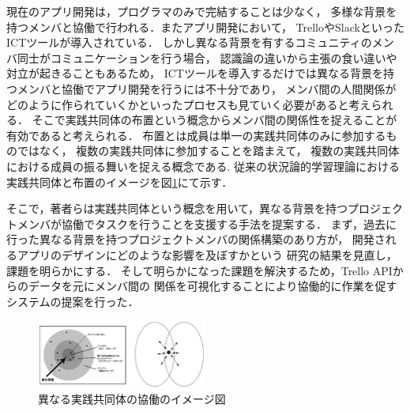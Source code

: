 
現在のアプリ開発は，プログラマのみで完結することは少なく，
多様な背景を持つメンバと協働で行われる．またアプリ開発において，
TrelloやSlackといったICTツールが導入されている．
しかし異なる背景を有するコミュニティのメンバ同士がコミュニケーションを行う場合，
認識論の違いから主張の食い違いや対立が起きることもあるため\cite{conflict}，
ICTツールを導入するだけでは異なる背景を持つメンバと協働でアプリ開発を行うには不十分であり，
メンバ間の人間関係がどのように作られていくかといったプロセスも見ていく必要があると考えられる．
そこで実践共同体\cite{Matsumoto}の布置という概念からメンバ間の関係性を捉えることが有効であると考えられる．
布置とは成員は単一の実践共同体のみに参加するものではなく，
複数の実践共同体に参加することを踏まえて，
複数の実践共同体における成員の振る舞いを捉える概念である.
従来の状況論的学習理論における実践共同体\cite{copImg}と布置のイメージを図\ref{cop-overlap}にて示す．

そこで，著者らは実践共同体という概念を用いて，異なる背景を持つプロジェクトメンバが協働でタスクを行うことを支援する手法を提案する．
まず，過去に行った異なる背景を持つプロジェクトメンバの関係構築のあり方が，
開発されるアプリのデザインにどのような影響を及ぼすかという
研究の結果を見直し，課題を明らかにする．
そして明らかになった課題を解決するため，Trello APIからのデータを元にメンバ間の
関係を可視化することにより協働的に作業を促すシステムの提案を行った．

\begin{figure}[h]
  \centering
  \includegraphics[width=0.5\textwidth]{img/cop-overlap.eps}
  \caption{異なる実践共同体の協働のイメージ図}
  \label{cop-overlap}
\end{figure}
